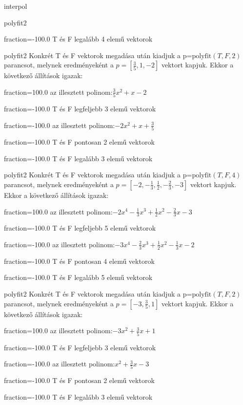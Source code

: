 \documentclass[12pt]{article}
\begin{document}
\begin{quiz}{interpol}
\begin{multi}[multiple]{polyfit2}
\item[fraction=-100.0] T és F legalább 4 elemű vektorok
\end{multi}
\begin{multi}[multiple]{polyfit2}
Konkrét T és F vektorok megadása után kiadjuk a p=$\mathrm{polyfit}(T,F,2)$
parancsot, melynek eredményeként a $p=\left[\frac{3}{5},1,-2\right]$ vektort kapjuk.
Ekkor a következő állítások igazak:
\item[fraction=100.0] az illesztett polinom:$\frac{3}{5}x^2+x-2$
\item[fraction=-100.0]  T és F legfeljebb 3 elemű vektorok
\item[fraction=-100.0]  az illesztett polinom:$-2x^2+x+\frac{3}{5}$
\item[fraction=-100.0]  T és F pontosan 2 elemű vektorok
\item[fraction=-100.0] T és F legalább 3 elemű vektorok
\end{multi}
\begin{multi}[multiple]{polyfit2}
Konkrét T és F vektorok megadása után kiadjuk a p=$\mathrm{polyfit}(T,F,4)$
parancsot, melynek eredményeként a $p=\left[-2,-\frac{1}{3},\frac{1}{2},-\frac{2}{3},-3\right]$ vektort kapjuk.
Ekkor a következő állítások igazak:
\item[fraction=100.0] az illesztett polinom:$-2x^4-\frac{1}{3}x^3+\frac{1}{2}x^2-\frac{2}{3}x-3$
\item[fraction=-100.0]  T és F legfeljebb 5 elemű vektorok
\item[fraction=-100.0]  az illesztett polinom:$-3x^4-\frac{2}{3}x^3+\frac{1}{2}x^2-\frac{1}{3}x-2$
\item[fraction=-100.0]  T és F pontosan 4 elemű vektorok
\item[fraction=-100.0] T és F legalább 5 elemű vektorok
\end{multi}
\begin{multi}[multiple]{polyfit2}
Konkrét T és F vektorok megadása után kiadjuk a p=$\mathrm{polyfit}(T,F,2)$
parancsot, melynek eredményeként a $p=\left[-3,\frac{3}{5},1\right]$ vektort kapjuk.
Ekkor a következő állítások igazak:
\item[fraction=100.0] az illesztett polinom:$-3x^2+\frac{3}{5}x+1$
\item[fraction=-100.0]  T és F legfeljebb 3 elemű vektorok
\item[fraction=-100.0]  az illesztett polinom:$x^2+\frac{3}{5}x-3$
\item[fraction=-100.0]  T és F pontosan 2 elemű vektorok
\item[fraction=-100.0] T és F legalább 3 elemű vektorok

\end{multi}
\end{quiz}
\end{document}

